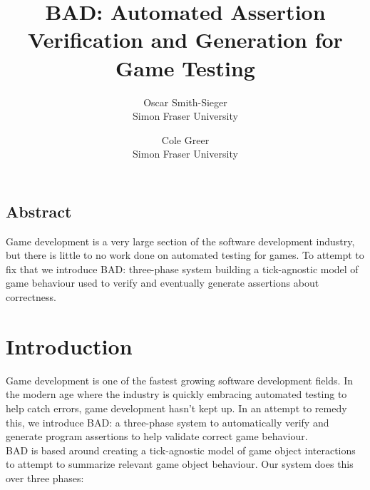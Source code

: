 \documentclass[letterpaper,twocolumn,10pt]{article}
\begin{document}
\date{}

\title{\Large \bf BAD: Automated Assertion Verification and Generation for Game Testing}

\author{
{\rm Oscar Smith-Sieger}\\
Simon Fraser University
\and
{\rm Cole Greer}\\
Simon Fraser University
} %

\maketitle

\thispagestyle{empty}


\subsection*{Abstract}

Game development is a very large section of the software development industry, but there is little to no work done on automated testing for games. To attempt to fix that we introduce BAD: three-phase system building a tick-agnostic model of game behaviour used to verify and eventually generate assertions about correctness. \\

\section{Introduction}


Game development is one of the fastest growing software development fields. In the modern age where the industry is quickly embracing automated testing to help catch errors, game development hasn't kept up. In an attempt to remedy this, we introduce BAD: a three-phase system to automatically verify and generate program assertions to help validate correct game behaviour.\\

BAD is based around creating a tick-agnostic model of game object interactions to attempt to summarize relevant game object behaviour. Our system does this over three phases:
\end{document}

